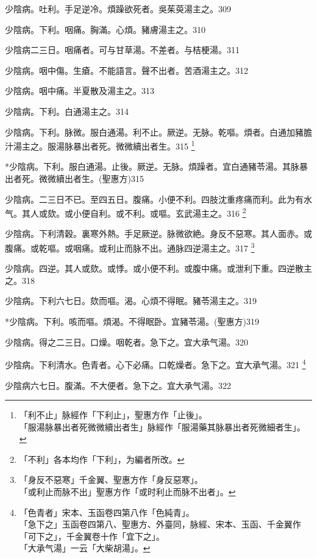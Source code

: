 \documentclass[12pt,twoside,UTF8,b5paper]{ctexbook}
\begin{document}
少陰病。吐利。手足逆{冷}。煩躁欲死者。{吳}茱萸湯主之。309

少陰病。下利。咽痛。胸滿。心煩。豬膚湯主之。310

少陰病二三日。咽痛者。可与甘草湯。不差者。与桔梗湯。311

少陰病。咽中傷。生瘡。不能語言。聲不出者。苦酒湯主之。312

少陰病。咽中痛。半夏散及湯主之。313

少陰病。下利。白通湯主之。314

少陰病。下利。脉微。服白通湯。利不止。厥逆。无脉。乾嘔。煩者。白通加豬膽汁湯主之。服湯脉暴出者死。微{微}續{出}者生。315
	\footnote{「利不止」脉經作「下利止」，聖惠方作「止後」。\\「服湯脉暴出者死微微續出者生」脉經作「服湯藥其脉暴出者死微細者生」。}

*少陰病。下利。服白通湯。止後。厥逆。无脉。煩躁者。宜白通豬苓湯。其脉暴出者死。微微續出者生。(聖惠方)315

少陰病。二三日不已。至四五日。腹痛。小便不利。四肢沈重疼痛而利。此为有水气。其人或欬。或小便{自}利。或不利。或嘔。玄武湯主之。316
	\footnote{「不利」各本均作「下利」，为編者所改。}

少陰病。下利清穀。裏寒外熱。手足厥逆。脉微欲絶。身反不惡寒。其人面赤。或腹痛。或乾嘔。或咽痛。或利止{而}脉不出。通脉四逆湯主之。317
	\footnote{「身反不惡寒」千金翼、聖惠方作「身反惡寒」。\\「或利止而脉不出」聖惠方作「或时利止而脉不出者」。}

少陰病。四逆。其人或欬。或悸。或小便不利。或腹中痛。或泄利下重。四逆散主之。318

少陰病。下利六七日。欬而嘔。渴。心煩不得眠。豬苓湯主之。319

*少陰病。下利。咳而嘔。煩渴。不得眠卧。宜豬苓湯。(聖惠方)319

少陰病。得之二三日。口燥。咽乾者。急下之。宜{大}承气湯。320

少陰病。{下}利清水。色青者。心下必痛。口乾燥者。急下之。宜{大}承气湯。321
	\footnote{「色青者」宋本、玉函卷四第八作「色純青」。\\「急下之」玉函卷四第八、聖惠方、外臺同，脉經、宋本、玉函、千金翼作「可下之」，千金翼卷十作「宜下之」。\\「大承气湯」一云「大柴胡湯」。}

少陰病六七日。腹滿。不大便者。急下之。宜{大}承气湯。322
\end{document}
